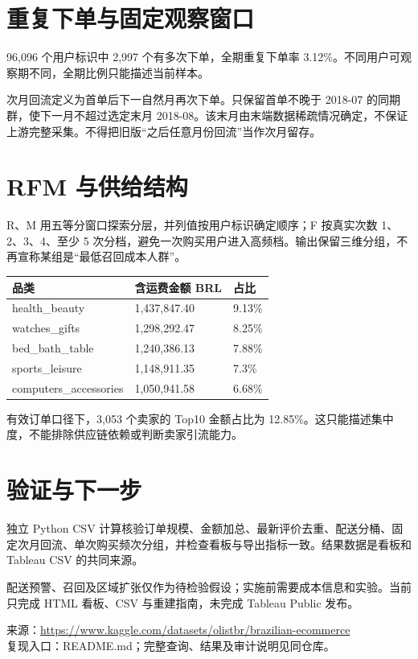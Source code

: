 \documentclass[11pt]{ctexart}
\begin{document}
\section{重复下单与固定观察窗口}
96,096 个用户标识中 2,997 个有多次下单，全期重复下单率 3.12\%。不同用户可观察期不同，全期比例只能描述当前样本。

次月回流定义为首单后下一自然月再次下单。只保留首单不晚于 2018-07 的同期群，使下一月不超过选定末月 2018-08。该末月由末端数据稀疏情况确定，不保证上游完整采集。不得把旧版“之后任意月份回流”当作次月留存。

\section{RFM 与供给结构}
R、M 用五等分窗口探索分层，并列值按用户标识确定顺序；F 按真实次数 1、2、3、4、至少 5 次分档，避免一次购买用户进入高频档。输出保留三维分组，不再宣称某组是“最低召回成本人群”。
\begin{center}
\small
\begin{tabular}{lll}
\toprule
品类 & 含运费金额 BRL & 占比 \\
\midrule
health\_beauty & 1,437,847.40 & 9.13\% \\
watches\_gifts & 1,298,292.47 & 8.25\% \\
bed\_bath\_table & 1,240,386.13 & 7.88\% \\
sports\_leisure & 1,148,911.35 & 7.3\% \\
computers\_accessories & 1,050,941.58 & 6.68\% \\
\bottomrule
\end{tabular}
\end{center}
有效订单口径下，3,053 个卖家的 Top10 金额占比为 12.85\%。这只能描述集中度，不能排除供应链依赖或判断卖家引流能力。

\section{验证与下一步}
独立 Python CSV 计算核验订单规模、金额加总、最新评价去重、配送分桶、固定次月回流、单次购买频次分组，并检查看板与导出指标一致。结果数据是看板和 Tableau CSV 的共同来源。

配送预警、召回及区域扩张仅作为待检验假设；实施前需要成本信息和实验。当前只完成 HTML 看板、CSV 与重建指南，未完成 Tableau Public 发布。

\noindent 来源：\url{https://www.kaggle.com/datasets/olistbr/brazilian-ecommerce}\\
复现入口：README.md；完整查询、结果及审计说明见同仓库。
\end{document}

